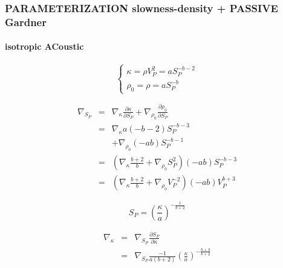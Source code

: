 \documentclass[9pt]{beamer}
\newcommand{\partderi}[2]{\frac{\partial#1}{\partial#2}}
\begin{document}
\begin{frame}
\end{frame}

\begin{frame}\frametitle{PARAMETERIZATION slowness-density + PASSIVE Gardner}
\framesubtitle{isotropic ACoustic}

  \begin{center}
  \end{center}

  \begin{minipage}{0.5\linewidth}
    \[\left\{ \begin{array}{l}
      \kappa = \rho V_P^2 = a S_P^{-b-2} \\
      \rho_0 = \rho = a S_P ^{-b}
    \end{array} \right.\]
    
    \begin{eqnarray}
      \nabla_{S_P} &=& \nabla_{\kappa} \partderi{\kappa}{S_P} + \nabla_{\rho_0} \partderi{\rho_0}{S_P} \nonumber\\
                   &=& \nabla_{\kappa} a(-b-2) S_P^{-b-3} \nonumber\\
                   & &+\nabla_{\rho_0} (-ab) S_P^{-b-1} \nonumber\\
                   &=& \left( \nabla_{\kappa} \frac{b+2}{b} + \nabla_{\rho_0} S_P^2 \right) (-ab)S_P^{-b-3} \nonumber\\
                   &=& \left( \nabla_{\kappa} \frac{b+2}{b} + \nabla_{\rho_0} V_P^{-2} \right) (-ab)V_P^{b+3} \nonumber
    \end{eqnarray}

  \end{minipage} \vline
  \begin{minipage}{0.45\linewidth}
    \[ S_P = \left(\frac{\kappa}{a}\right)^{-\frac{1}{b+2}} \]
    
    \begin{eqnarray}
      \nabla_{\kappa} &=& \nabla_{S_P} \partderi{S_P}{\kappa} \nonumber\\
                      &=& \nabla_{S_P} \frac{-1}{a(b+2)} \left(\frac{\kappa}{a}\right)^{-\frac{b+3}{b+2}} \nonumber
    \end{eqnarray}
  \end{minipage}

\end{frame}
\end{document}
